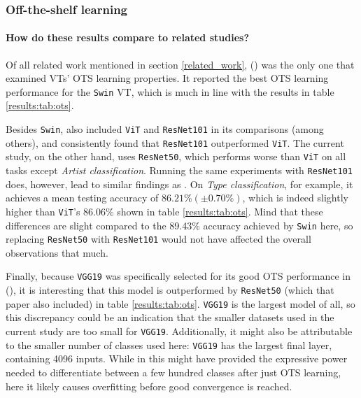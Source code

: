 \subsubsection{Off-the-shelf learning}

\paragraph{How do these results compare to related studies?}
Of all related work mentioned in section \ref{related_work}, \citeauthor{zhou2021convnets} (\citeyear{zhou2021convnets}) was the only one that examined VTs' OTS learning properties. It reported the best OTS learning performance for the \texttt{Swin} VT, which is much in line with the results in table \ref{results:tab:ots}.

Besides \texttt{Swin}, \citeauthor{zhou2021convnets} also included \texttt{ViT} and \texttt{ResNet101} in its comparisons (among others), and consistently found that \texttt{ResNet101} outperformed \texttt{ViT}. The current study, on the other hand, uses \texttt{ResNet50}, which performs worse than \texttt{ViT} on all tasks except \textit{Artist classification}. Running the same experiments with \texttt{ResNet101} does, however, lead to similar findings as \citeauthor{zhou2021convnets}. On \textit{Type classification}, for example, it achieves a mean testing accuracy of  $86.21\% (\pm 0.70\%)$, which is indeed slightly higher than \texttt{ViT}'s 86.06\% shown in table \ref{results:tab:ots}. Mind that these differences are slight compared to the 89.43\% accuracy achieved by \texttt{Swin} here, so replacing \texttt{ResNet50} with \texttt{ResNet101} would not have affected the overall observations that much.

Finally, because \texttt{VGG19} was specifically selected for its good OTS performance in \citeauthor{sabatelli2018deep} (\citeyear{sabatelli2018deep}), it is interesting that this model is outperformed by \texttt{ResNet50} (which that paper also included) in table \ref{results:tab:ots}. \texttt{VGG19} is the largest model of all, so this discrepancy could be an indication that the smaller datasets used in the current study are too small for \texttt{VGG19}. Additionally, it might also be attributable to the smaller number of classes used here: \texttt{VGG19} has the largest final layer, containing 4096 inputs. While in \citeauthor{sabatelli2018deep} this might have provided the expressive power needed to differentiate between a few hundred classes after just OTS learning, here it likely causes overfitting before good convergence is reached.

